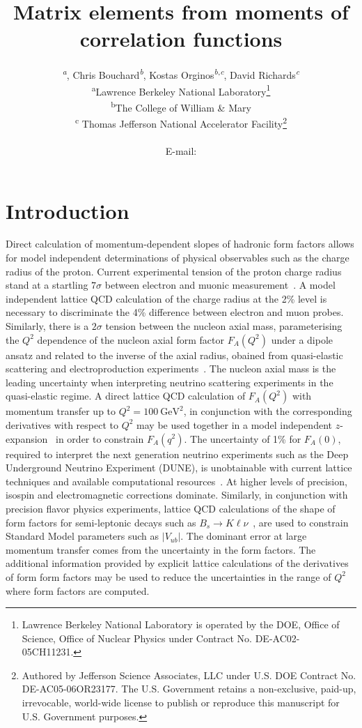 \documentclass{PoS}
\title{Matrix elements from moments of correlation functions}
\author{\speaker{Chia Cheng Chang}\textsuperscript{\textnormal{\textit{a}}}, 
Chris Bouchard\textsuperscript{\textnormal{\textit{b}}},
Kostas Orginos\textsuperscript{\textnormal{\textit{b},\textit{c}}},
David Richards\textsuperscript{\textnormal{\textit{c}}}\\
    \textsuperscript{a}Lawrence Berkeley National Laboratory\thanks{Lawrence Berkeley National Laboratory is operated by the DOE, Office of Science, Office of Nuclear Physics under Contract No. DE-AC02-05CH11231.}\\ 
    \textsuperscript{b}The College of William \& Mary\\
    \textsuperscript{c} Thomas Jefferson National Accelerator Facility\thanks{Authored by Jefferson Science Associates, LLC under U.S. DOE Contract No. DE-AC05-06OR23177. The U.S. Government retains a non-exclusive, paid-up, irrevocable, world-wide license to publish or reproduce this manuscript for U.S. Government purposes.}\\
    \\
        E-mail: \email{chiachang@lbl.gov}}
\begin{document}
\section{Introduction}
Direct calculation of momentum-dependent slopes of hadronic form factors allows for model independent determinations of physical observables such as the charge radius of the proton.  Current experimental tension of the proton charge radius stand at a startling $7\sigma$ between electron and muonic measurement~\cite{Carlson:2015jba}. A model independent lattice QCD calculation of the charge radius at the 2\% level is necessary to discriminate the 4\% difference between electron and muon probes. Similarly, there is a $2\sigma$ tension between the nucleon axial mass, parameterising the $Q^2$ dependence of the nucleon axial form factor $F_A(Q^2)$ under a dipole ansatz and related to the inverse of the axial radius, obained from quasi-elastic scattering and electroproduction experiments~\cite{Anikin:2016teg}. The nucleon axial mass is the leading uncertainty when interpreting neutrino scattering experiments in the quasi-elastic regime. A direct lattice QCD calculation of $F_A(Q^2)$ with momentum transfer up to $Q^2=100~\text{GeV}^2$, in conjunction with the corresponding  derivatives with respect to $Q^2$  may be used together in a model independent $z$-expansion~\cite{Bhattacharya:2011ah} in order to constrain $F_A(q^2)$.  The uncertainty of 1\% for $F_A(0)$, required to interpret the next generation neutrino experiments such as the Deep Underground Neutrino Experiment (DUNE), is unobtainable with current lattice techniques and  available computational resources~\cite{Bhattacharya:2016zcn}. At higher levels of precision, isospin and electromagnetic corrections dominate. Similarly, in conjunction with precision flavor physics experiments, lattice QCD calculations of the shape of form factors for semi-leptonic decays such as $B_s\rightarrow K \ell \nu$~\cite{Bouchard:2014ypa}, are used to constrain Standard Model parameters such as $|V_{ub}|$. The dominant error at large momentum transfer comes from the uncertainty in the form factors. The additional information provided by explicit lattice calculations of the derivatives of form form factors may be used to reduce the uncertainties in the range of  $Q^2$ where form factors are computed.
\end{document}
